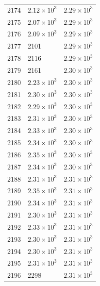 \begin{table}[H]
\begin{tabular}{lll}
2174 & $\displaystyle 2.12 \times 10^{3}$ & $\displaystyle 2.29 \times 10^{3}$ \\
2175 & $\displaystyle 2.07 \times 10^{3}$ & $\displaystyle 2.29 \times 10^{3}$ \\
2176 & $\displaystyle 2.09 \times 10^{3}$ & $\displaystyle 2.29 \times 10^{3}$ \\
2177 & 2101 & $\displaystyle 2.29 \times 10^{3}$ \\
2178 & 2116 & $\displaystyle 2.29 \times 10^{3}$ \\
2179 & 2161 & $\displaystyle 2.30 \times 10^{3}$ \\
2180 & $\displaystyle 2.23 \times 10^{3}$ & $\displaystyle 2.30 \times 10^{3}$ \\
2181 & $\displaystyle 2.30 \times 10^{3}$ & $\displaystyle 2.30 \times 10^{3}$ \\
2182 & $\displaystyle 2.29 \times 10^{3}$ & $\displaystyle 2.30 \times 10^{3}$ \\
2183 & $\displaystyle 2.31 \times 10^{3}$ & $\displaystyle 2.30 \times 10^{3}$ \\
2184 & $\displaystyle 2.33 \times 10^{3}$ & $\displaystyle 2.30 \times 10^{3}$ \\
2185 & $\displaystyle 2.34 \times 10^{3}$ & $\displaystyle 2.30 \times 10^{3}$ \\
2186 & $\displaystyle 2.35 \times 10^{3}$ & $\displaystyle 2.30 \times 10^{3}$ \\
2187 & $\displaystyle 2.34 \times 10^{3}$ & $\displaystyle 2.30 \times 10^{3}$ \\
2188 & $\displaystyle 2.31 \times 10^{3}$ & $\displaystyle 2.31 \times 10^{3}$ \\
2189 & $\displaystyle 2.35 \times 10^{3}$ & $\displaystyle 2.31 \times 10^{3}$ \\
2190 & $\displaystyle 2.34 \times 10^{3}$ & $\displaystyle 2.31 \times 10^{3}$ \\
2191 & $\displaystyle 2.30 \times 10^{3}$ & $\displaystyle 2.31 \times 10^{3}$ \\
2192 & $\displaystyle 2.33 \times 10^{3}$ & $\displaystyle 2.31 \times 10^{3}$ \\
2193 & $\displaystyle 2.30 \times 10^{3}$ & $\displaystyle 2.31 \times 10^{3}$ \\
2194 & $\displaystyle 2.30 \times 10^{3}$ & $\displaystyle 2.31 \times 10^{3}$ \\
2195 & $\displaystyle 2.31 \times 10^{3}$ & $\displaystyle 2.31 \times 10^{3}$ \\
2196 & 2298 & $\displaystyle 2.31 \times 10^{3}$ \\

\end{tabular}
\end{table}
